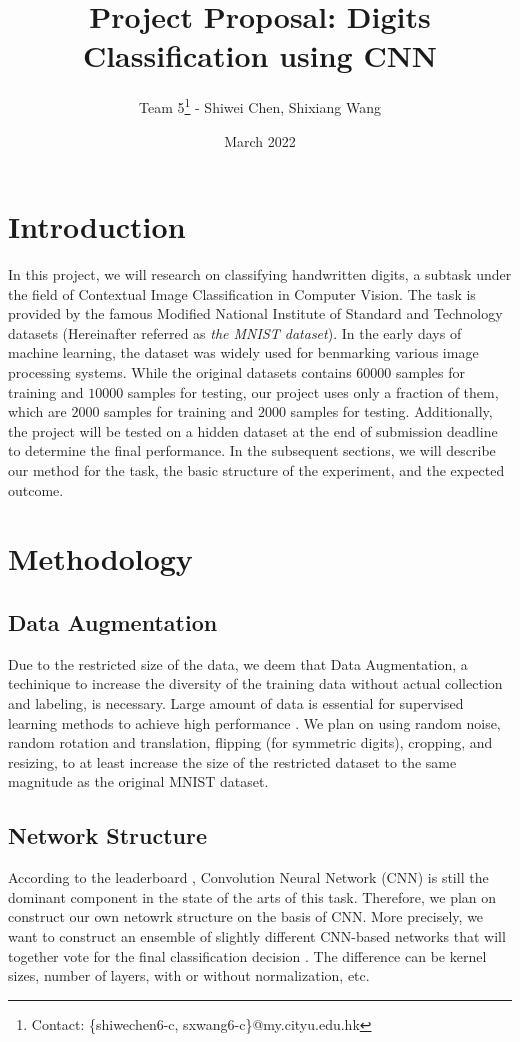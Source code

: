 \documentclass{article}
\title{Project Proposal: Digits Classification using CNN}
\author{Team 5\footnote{Contact: \{shiwechen6-c, sxwang6-c\}@my.cityu.edu.hk}  \:- Shiwei Chen, Shixiang Wang}
\date{March 2022}
\begin{document}
\maketitle

\section{Introduction}
In this project, we will research on classifying handwritten digits, a subtask under the field of Contextual Image Classification in Computer Vision. The task is provided by the famous Modified National Institute of Standard and Technology datasets \cite{ref1} (Hereinafter referred as \textit{the MNIST dataset}). In the early days of machine learning, the dataset was widely used for benmarking various image processing systems. While the original datasets contains $60000$ samples for training and $10000$ samples for testing, our project uses only a fraction of them, which are $2000$ samples for training and $2000$ samples for testing. Additionally, the project will be tested on a hidden dataset at the end of submission deadline to determine the final performance. In the subsequent sections, we will describe our method for the task, the basic structure of the experiment, and the expected outcome.

\section{Methodology}
    \subsection{Data Augmentation}
    Due to the restricted size of the data, we deem that Data Augmentation, a techinique to increase the diversity of the training data without actual collection and labeling, is necessary. Large amount of data is essential for supervised learning methods to achieve high performance \cite{ref2}. We plan on using random noise, random rotation and translation, flipping (for symmetric digits), cropping, and resizing, to at least increase the size of the restricted dataset to the same magnitude as the original MNIST dataset.
    \subsection{Network Structure}
    According to the leaderboard \cite{ref3}, Convolution Neural Network (CNN)\cite{ref4} is still the dominant component in the state of the arts of this task. Therefore, we plan on construct our own netowrk structure on the basis of CNN. More precisely, we want to construct an ensemble of slightly different CNN-based networks that will together vote for the final classification decision \cite{ref5}. The difference can be kernel sizes, number of layers, with or without normalization, etc. 
\end{document}
